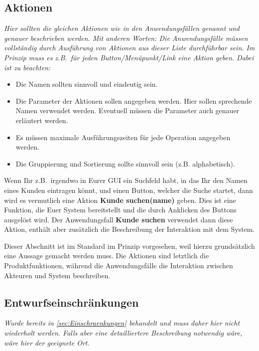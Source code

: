 \documentclass[fontsize=12pt,paper=a4,twoside]{scrartcl}
\newcommand{\highlight}[1]{\textcolor{blue}{\textbf{#1}}}
\newcommand{\nurlangversion}[0]{%
\ifthenelse{\boolean{langversion}}{\highlight{}}{\highlight{Entfällt in SWP-1}}}
\begin{document}
\subsection{Aktionen}
  {\em Hier sollten die gleichen Aktionen wie in den Anwendungsfällen
  genannt und genauer beschrieben werden. Mit anderen Worten: Die
  Anwendungsfälle müssen vollständig durch Ausführung von Aktionen aus
  dieser Liste durchführbar sein. Im Prinzip muss es z.B.\ für jeden
  Button/Menüpunkt/Link eine Aktion geben. Dabei ist zu beachten:
  \begin{itemize}
    \item Die Namen sollten sinnvoll und eindeutig sein.

    \item Die Parameter der Aktionen sollen angegeben werden. Hier
    sollen sprechende Namen verwendet werden. Eventuell müssen die
    Parameter auch genauer erläutert werden.

    \item Es müssen maximale Ausführungszeiten für jede Operation
    angegeben werden.
    
  \item Die Gruppierung und Sortierung sollte sinnvoll sein
    (z.B. alphabetisch).
  \end{itemize}

  Wenn Ihr z.B.\ irgendwo in Eurer GUI ein Suchfeld habt, in das Ihr
  den Namen eines Kunden eintragen könnt, und einen Button, welcher die
  Suche startet, dann wird es vermutlich eine Aktion {\bf Kunde
    suchen(name)} geben. Dies ist eine Funktion, die Euer System
  bereitstellt und die durch Anklicken des Buttons ausgelöst wird. Der
  Anwendungsfall {\bf Kunde suchen} verwendet dann diese Aktion,
  enthält aber zusätzlich die Beschreibung der Interaktion mit dem
  System.
  
  Dieser Abschnitt ist im Standard im Prinzip vorgesehen, weil hierzu
  grundsätzlich eine Aussage gemacht werden muss. Die Aktionen sind
  letztlich die Produktfunktionen, während die Anwendungsfälle die
  Interaktion zwischen Akteuren und System beschreiben. }

  
\subsection{Entwurfseinschränkungen}
\nurlangversion

{\em Wurde bereits in \ref{sec:Einschraenkungen} behandelt und muss
  daher hier nicht wiederholt werden. Falls aber eine detailliertere
  Beschreibung notwendig wäre, wäre hier der geeignete Ort.}
  
\end{document}
